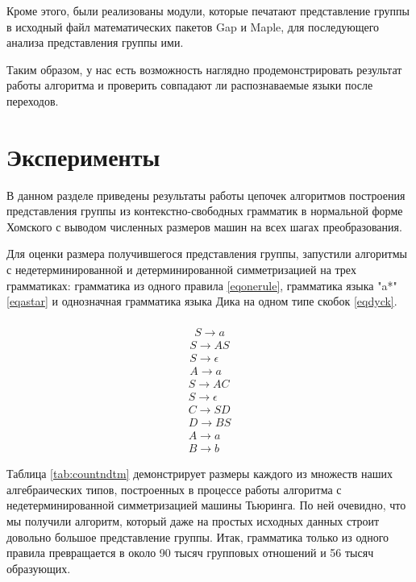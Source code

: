 \documentclass[14pt]{matmex-diploma-custom}
\begin{document}
Кроме этого, были реализованы модули, которые печатают представление группы в исходный файл математических пакетов Gap и Maple, для последующего анализа представления группы ими. 

Таким образом, у нас есть возможность наглядно продемонстрировать результат работы алгоритма и проверить совпадают ли распознаваемые языки после переходов. 

\section{Эксперименты}
В данном разделе приведены результаты работы цепочек алгоритмов построения представления группы из контекстно-свободных грамматик в нормальной форме Хомского с выводом численных размеров машин на всех шагах преобразования. 

Для оценки размера получившегося представления группы, запустили
алгоритмы с недетерминированной и детерминированной
симметризацией на трех грамматиках: грамматика из одного правила \eqref{eqonerule},
грамматика языка "a*" \eqref{eqastar} и однозначная грамматика языка Дика на одном типе скобок \eqref{eqdyck}.

\begin{multicols}{2}
\noindent
\centering
    \begin{align}
        \nonumber \\ S \to a \label{eqonerule}
    \end{align}
    \begin{align}
        S \to AS \nonumber \\
        S \to \epsilon \label{eqastar} \\
        A \to a \nonumber
    \end{align}
    \begin{align}
        S \to AC \nonumber \\
        S \to \epsilon \nonumber \\
        C \to SD \label{eqdyck} \\
        D \to BS \nonumber \\
        A \to a \nonumber \\
        B \to b \nonumber
    \end{align}
\end{multicols}

Таблица \ref{tab:countndtm} демонстрирует размеры каждого из множеств наших алгебраических типов, построенных в процессе работы алгоритма с недетерминированной симметризацией машины Тьюринга. По ней очевидно, что мы получили алгоритм, который даже на простых исходных данных строит довольно большое представление группы. Итак, грамматика только из одного правила превращается в около 90 тысяч групповых отношений и 56 тысяч образующих. 
\end{document}
